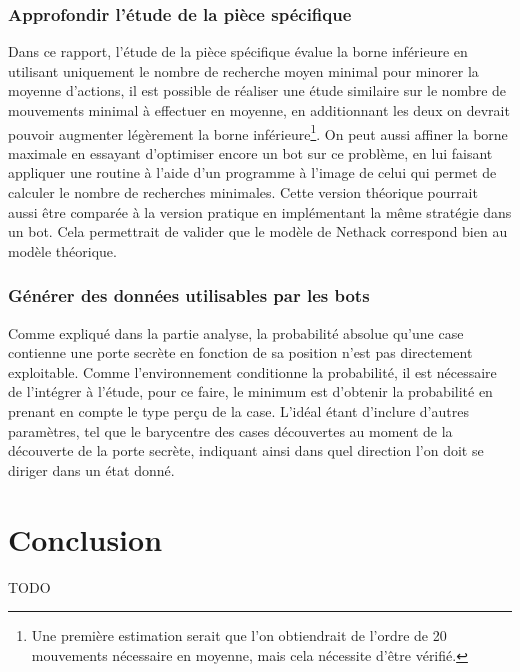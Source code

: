 \documentclass[a4paper,12pt]{article}
\begin{document}
\subsubsection{Approfondir l'étude de la pièce spécifique}
Dans ce rapport, l'étude de la pièce spécifique évalue la borne inférieure en
utilisant uniquement le nombre de recherche moyen minimal pour minorer la
moyenne d'actions, il est possible de réaliser une étude similaire sur le nombre
de mouvements minimal à effectuer en moyenne, en additionnant les deux on
devrait pouvoir augmenter légèrement la borne inférieure\footnote{Une première
estimation serait que l'on obtiendrait de l'ordre de 20 mouvements nécessaire en
moyenne, mais cela nécessite d'être vérifié.}. On peut aussi affiner la borne
maximale en essayant d'optimiser encore un bot sur ce problème, en lui faisant
appliquer une routine à l'aide d'un programme à l'image de celui qui permet de
calculer le nombre de recherches minimales. Cette version théorique pourrait
aussi être comparée à la version pratique en implémentant la même stratégie dans
un bot. Cela permettrait de valider que le modèle de Nethack correspond bien au
modèle théorique.

\subsubsection{Générer des données utilisables par les bots}
Comme expliqué dans la partie analyse, la probabilité absolue qu'une case
contienne une porte secrète en fonction de sa position n'est pas directement
exploitable. Comme l'environnement conditionne la probabilité, il est nécessaire
de l'intégrer à l'étude, pour ce faire, le minimum est d'obtenir la probabilité
en prenant en compte le type perçu de la case. L'idéal étant d'inclure d'autres
paramètres, tel que le barycentre des cases découvertes au moment de la
découverte de la porte secrète, indiquant ainsi dans quel direction l'on doit
se diriger dans un état donné.

\section{Conclusion}
TODO
\end{document}
